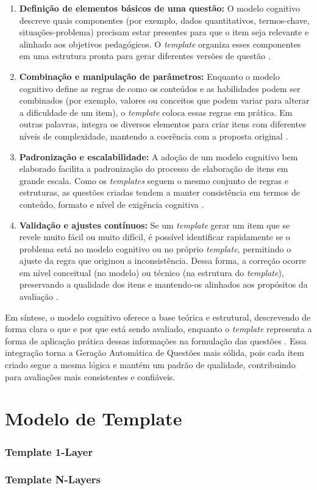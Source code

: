 \begin{enumerate} \item \textbf{Definição de elementos básicos de uma questão:} O modelo cognitivo descreve quais componentes (por exemplo, dados quantitativos, termos-chave, situações-problema) precisam estar presentes para que o item seja relevante e alinhado aos objetivos pedagógicos. O \textit{template} organiza esses componentes em uma estrutura pronta para gerar diferentes versões de questão \cite{lane2016}.
\item \textbf{Combinação e manipulação de parâmetros:} Enquanto o modelo cognitivo define as regras de como os conteúdos e as habilidades podem ser combinados (por exemplo, valores ou conceitos que podem variar para alterar a dificuldade de um item), o \textit{template} coloca essas regras em prática. Em outras palavras, integra os diversos elementos para criar itens com diferentes níveis de complexidade, mantendo a coerência com a proposta original \cite{embretson2017}.

\item \textbf{Padronização e escalabilidade:} A adoção de um modelo cognitivo bem elaborado facilita a padronização do processo de elaboração de itens em grande escala. Como os \textit{templates} seguem o mesmo conjunto de regras e estruturas, as questões criadas tendem a manter consistência em termos de conteúdo, formato e nível de exigência cognitiva \cite{gierl2016, gierl2017}.

\item \textbf{Validação e ajustes contínuos:} Se um \textit{template} gerar um item que se revele muito fácil ou muito difícil, é possível identificar rapidamente se o problema está no modelo cognitivo ou no próprio \textit{template}, permitindo o ajuste da regra que originou a inconsistência. Dessa forma, a correção ocorre em nível conceitual (no modelo) ou técnico (na estrutura do \textit{template}), preservando a qualidade dos itens e mantendo-os alinhados aos propósitos da avaliação \cite{gierlbulutzhang2018}.
\end{enumerate}
Em síntese, o modelo cognitivo oferece a base teórica e estrutural, descrevendo de forma clara o que e por que está sendo avaliado, enquanto o \textit{template} representa a forma de aplicação prática dessas informações na formulação das questões \cite{gierl2024}. Essa integração torna a Geração Automática de Questões mais sólida, pois cada item criado segue a mesma lógica e mantém um padrão de qualidade, contribuindo para avaliações mais consistentes e confiáveis.

\section{Modelo de Template}

\subsubsection{Template 1-Layer}
\subsubsection{Template N-Layers}

